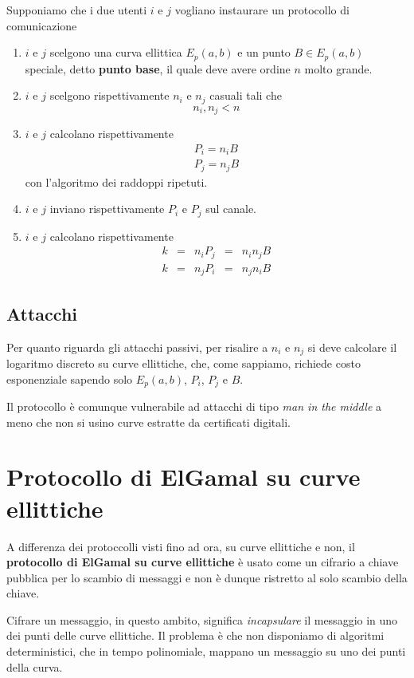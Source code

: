 Supponiamo che i due utenti $i$ e $j$ vogliano instaurare un protocollo di comunicazione
\begin{enumerate}
	\item $i$ e $j$ scelgono una curva ellittica $E_p(a, b)$ e un punto $B \in E_p(a, b)$ speciale, detto
	      \textbf{punto base}, il quale deve avere ordine $n$ molto grande.
	\item $i$ e $j$ scelgono rispettivamente $n_i$ e $n_j$ casuali tali che
	      \[ n_i, n_j < n \]
	\item $i$ e $j$ calcolano rispettivamente
	      \[
		      \begin{matrix}
			      P_i = n_i B \\
			      P_j = n_j B
		      \end{matrix}
	      \]
	      con l'algoritmo dei raddoppi ripetuti.
	\item $i$ e $j$ inviano rispettivamente $P_i$ e $P_j$ sul canale.
	\item $i$ e $j$ calcolano rispettivamente
	      \[
		      \begin{matrix}
			      k & = & n_i P_j & = & n_i n_j B \\
			      k & = & n_j P_i & = & n_j n_i B
		      \end{matrix}
	      \]
\end{enumerate}

\subsection{Attacchi}
Per quanto riguarda gli attacchi passivi, per risalire a $n_i$ e $n_j$ si deve calcolare il logaritmo discreto
su curve ellittiche, che, come sappiamo, richiede costo esponenziale sapendo solo $E_p(a, b)$, $P_i$, $P_j$ e $B$.

Il protocollo \`e comunque vulnerabile ad attacchi di tipo \emph{man in the middle} a meno che non si usino curve
estratte da certificati digitali.

\section{Protocollo di ElGamal su curve ellittiche}
A differenza dei protoccolli visti fino ad ora, su curve ellittiche e non, il \textbf{protocollo di ElGamal su curve
	ellittiche} \`e usato come un cifrario a chiave pubblica per lo scambio di messaggi e non \`e dunque ristretto
al solo scambio della chiave.

Cifrare un messaggio, in questo ambito, significa \emph{incapsulare} il messaggio in uno dei punti delle curve
ellittiche. Il problema \`e che non disponiamo di algoritmi deterministici, che in tempo polinomiale, mappano
un messaggio su uno dei punti della curva.

